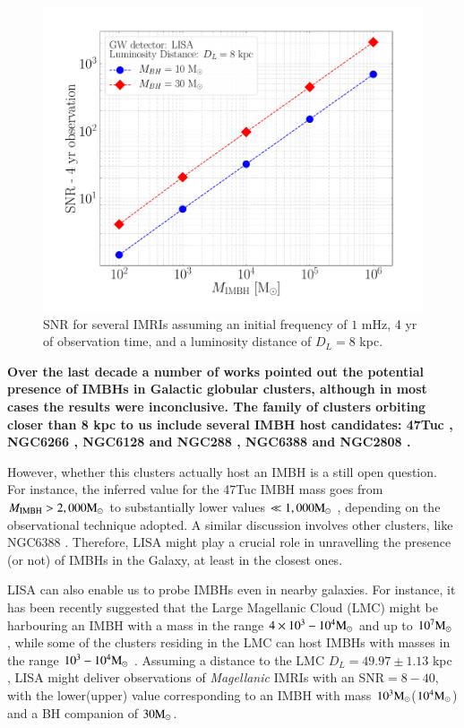\documentclass[article]{aa}
\newcommand{\Ms}{{\rm M}_\odot}
\newcommand{\ibh}{{\rm IMBH}}
\begin{document}
\begin{figure}
    \centering
    \includegraphics[width=\columnwidth]{snr_MW}
    \caption{SNR for several IMRIs assuming an initial frequency of $1$ mHz, 4 yr of observation time, and a luminosity distance of $D_L = 8$ kpc.}
    \label{SNRMW}
\end{figure}

{\bf Over the last decade a number of works pointed out the potential presence of IMBHs in Galactic globular clusters, although in most cases the results were inconclusive. The family of clusters orbiting closer than 8 kpc to us include several IMBH host candidates: 47Tuc \citep{kiziltan17}, NGC6266 \citep{abbate19}, NGC6128 and NGC288 \citep{sollima16}, NGC6388 and NGC2808 \citep{miocchi07,lanzoni07}.

However, whether this clusters actually host an IMBH is a still open question. For instance, the inferred value for the 47Tuc IMBH mass goes from $M_\ibh > 2,000\Ms$ \citep{kiziltan17} to substantially lower values $\ll 1,000\Ms$ \citep{abbate19b}, depending on the observational technique adopted. A similar discussion involves other clusters, like NGC6388 \citep{lanzoni13,lutzgendorf13}. Therefore, LISA might play a crucial role in unravelling the presence (or not) of IMBHs in the Galaxy, at least in the closest ones.

LISA can also enable us to probe IMBHs even in nearby galaxies. For instance, it has been recently suggested that the Large Magellanic Cloud (LMC) might be harbouring an IMBH with a mass in the range $4\times 10^3-10^4\Ms$ \citep{erkal19} and up to $10^7\Ms$ \citep{boyce17}, while some of the clusters residing in the LMC can host IMBHs with masses in the range $10^3-10^4\Ms$ \citep{gualandris07}. Assuming a distance to the LMC $D_L = 49.97 \pm 1.13$ kpc \citep{pietrzy13}, LISA might deliver observations of {\it Magellanic} IMRIs with an SNR$= 8-40$, with the lower(upper) value corresponding to an IMBH with mass $10^3\Ms$($10^4\Ms$) and a BH companion of $30\Ms$. 
}
\end{document}

